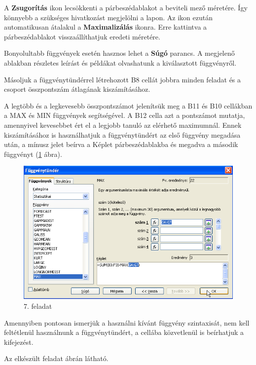 A \textbf{Zsugorítás} ikon lecsökkenti a párbeszédablakot a
beviteli mező méretére. Így könnyebb a szükséges
hivatkozást megjelölni a lapon. Az ikon ezután automatikusan
átalakul a \textbf{Maximalizálás} ikonra. Erre kattintva a
párbeszédablakot visszaállíthatjuk eredeti méretére.

Bonyolultabb függvények esetén hasznos lehet a \textbf{Súgó}
parancs. A megjelenő ablakban részletes leírást és
példákat olvashatunk a kiválasztott függvényről.

Másoljuk a függvénytündérrel létrehozott B8 cellát jobbra
minden feladat és a csoport összpontszám átlagának
kiszámításához.

A legtöbb és a legkevesebb összpontszámot jelenítsük meg a
B11 és B10 cellákban a MAX és MIN függvények
segítségével. A B12 cella azt a pontszámot mutatja, amennyivel
kevesebbet ért el a legjobb tanuló az elérhető maximumnál.
Ennek kiszámításához is használhatjuk a
függvénytündért az első függvény megadása után, a
 mínusz jelet beírva a Képlet párbeszédablakba és megadva
a második függvényt (\ref{7-feladatMásodik} ábra).

\begin{figure}[!h]
\begin{center}
\includegraphics[width=15.999cm]{oocalcv1-img39.png}
\caption{ 7. feladat}\label{7-feladatMásodik}
\end{center}
\end{figure}

Amennyiben pontosan ismerjük a használni kívánt függvény
szintaxisát, nem kell feltétlenül használnunk a
függvénytündért, a cellába közvetlenül is beírhatjuk a
kifejezést.

\clearpage
Az elkészült feladat  ábrán látható.

